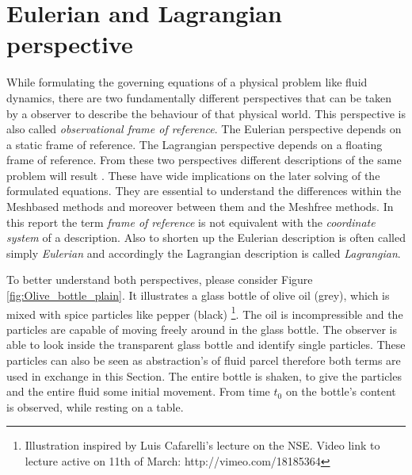 \section{Eulerian and Lagrangian perspective} 
\label{sec:mathperspective}

While formulating the governing equations of a physical problem like fluid dynamics, there are two fundamentally different perspectives that can be taken by a observer to describe
the behaviour of that physical world. This perspective is also called \emph{observational frame of reference}. The Eulerian perspective depends on a static frame of reference. The Lagrangian perspective depends on a floating frame of reference. From these two perspectives different descriptions of the same problem will result . These have wide implications on the later solving of the formulated equations. They are essential to understand the differences within the Meshbased methods and moreover between them and the Meshfree methods.    In this report the term \emph{frame of reference} is not equivalent with the \emph{coordinate system} of a description. Also to shorten up the Eulerian description is often called simply \emph{Eulerian} and accordingly the Lagrangian description is called \emph{Lagrangian}.

To better understand both perspectives, please consider Figure \ref{fig:Olive_bottle_plain}. It illustrates
a glass bottle of olive oil (grey), which is mixed with spice particles like pepper (black) \footnote{Illustration inspired by Luis Cafarelli's lecture on the NSE. Video link to lecture active on 11th of March: http://vimeo.com/18185364}. The oil is incompressible and the particles are capable of moving freely around in the glass bottle. The observer is able to look inside the transparent glass bottle and identify single particles. These particles can also be seen as abstraction's of fluid parcel therefore both terms are used in exchange in this Section. The entire bottle is shaken, to give the particles and the entire fluid some initial movement. From time $t_{0}$ on the bottle's content is observed, while resting on a table.


